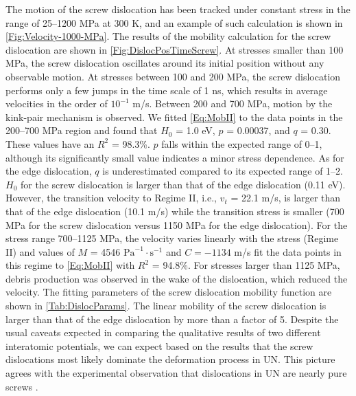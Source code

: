 \documentclass[applsci,article,submit,pdftex,moreauthors]{Definitions/mdpi}
\newcommand{\?}{\stackrel{?}{=}}
\begin{document}
The motion of the screw dislocation has been tracked under constant stress in the range of 25--1200 MPa at 300 K, and an example of such calculation is shown in \cref{Fig:Velocity-1000-MPa}. The results of the mobility calculation for the screw dislocation are shown in \cref{Fig:DislocPosTimeScrew}. At stresses smaller than 100 MPa, the screw dislocation oscillates around its initial position without any observable motion. At stresses between 100 and 200 MPa, the screw dislocation performs only a few jumps in the time scale of 1 ns, which results in average velocities in the order of $10^{-1}$ m/s. Between 200 and 700 MPa, motion by the kink-pair mechanism is observed. We fitted \cref{Eq:MobII} to the data points in the 200--700 MPa region and found that $H_0$ = 1.0 eV, $p$ = 0.00037, and $q$ = 0.30. These values have an $R^2$ = 98.3\%. $p$ falls within the expected range of 0--1, although its significantly small value indicates a minor stress dependence. As for the edge dislocation, $q$ is underestimated compared to its expected range of 1--2. $H_0$ for the screw dislocation is larger than that of the edge dislocation (0.11 eV). However, the transition velocity to Regime II, i.e., $v_t$ = 22.1 m/s, is larger than that of the edge dislocation (10.1 m/s) while the transition stress is smaller (700 MPa for the screw dislocation versus 1150 MPa for the edge dislocation). For the stress range 700--1125 MPa, the velocity varies linearly with the stress (Regime II) and values of $M$ = 4546 $\mathrm{Pa}^{-1} \! \cdot \! \mathrm{s}^{-1}$ and $C = - 1134$ m/s fit the data points in this regime to \cref{Eq:MobII} with $R^2$ = 94.8\%. For stresses larger than 1125 MPa, debris production was observed in the wake of the dislocation, which reduced the velocity. The fitting parameters of the screw dislocation mobility function are shown in \cref{Tab:DislocParams}. The linear mobility of the screw dislocation is larger than that of the edge dislocation by more than a factor of 5. Despite the usual caveats expected in comparing the qualitative results of two different interatomic potentials, we can expect based on the results that the screw dislocations most likely dominate the deformation process in UN. This picture agrees with the experimental observation that dislocations in UN are nearly pure screws \cite{Sole1968}.
\end{document}
